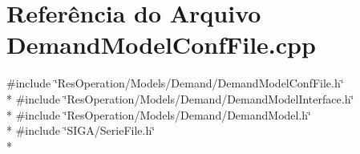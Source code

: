 \section{Referência do Arquivo Demand\+Model\+Conf\+File.\+cpp}
\label{_demand_model_conf_file_8cpp}
{\ttfamily \#include \char`\"{}Res\+Operation/\+Models/\+Demand/\+Demand\+Model\+Conf\+File.\+h\char`\"{}}\\*
{\ttfamily \#include \char`\"{}Res\+Operation/\+Models/\+Demand/\+Demand\+Model\+Interface.\+h\char`\"{}}\\*
{\ttfamily \#include \char`\"{}Res\+Operation/\+Models/\+Demand/\+Demand\+Model.\+h\char`\"{}}\\*
{\ttfamily \#include \char`\"{}S\+I\+G\+A/\+Serie\+File.\+h\char`\"{}}\\*
